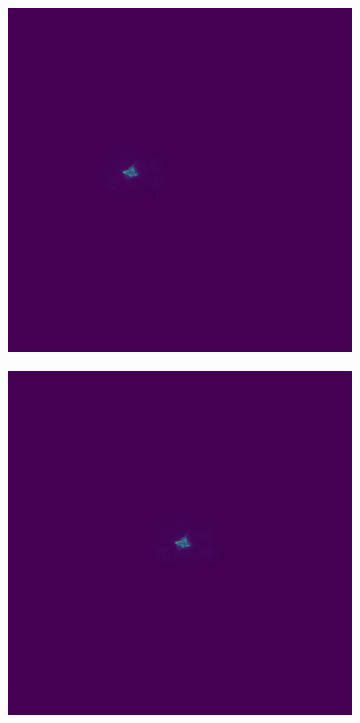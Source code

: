\begin{figure}
\begin{subfigure}{0.23\textwidth}
		\caption{}
		\label{fig:puw_fft_filter}
	\end{subfigure}
	\begin{subfigure}{0.23\textwidth}
		\centering
		\includegraphics[width=1\linewidth, scale=0.5]{images/puw_new_fringe_order1.png}
		\caption{}
		\label{fig:puw_new_fringe_order1}
	\end{subfigure}
	\begin{subfigure}{0.23\textwidth}
		\centering
		\includegraphics[width=1\linewidth, scale=0.5]{images/puw_order1_roll.png}
		\caption{}
		\label{fig:puw_order1_roll}
	\end{subfigure}
	

\end{figure}
